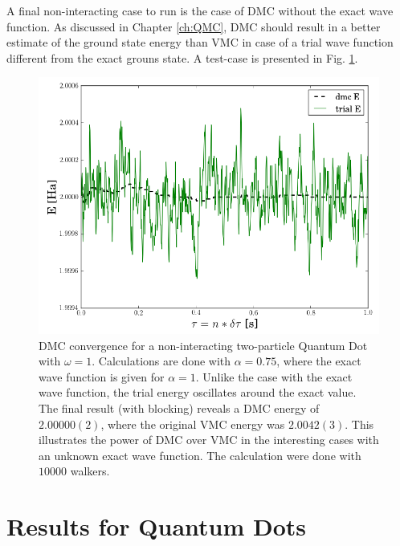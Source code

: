 A final non-interacting case to run is the case of DMC without the exact wave function. As discussed in Chapter \ref{ch:QMC}, DMC should result in a better estimate of the ground state energy than VMC in case of a trial wave function different from the exact grouns state. A test-case is presented in Fig. \ref{fig:DMC_nonExactWF}.

\begin{figure}
 \begin{center}
  \includegraphics[scale=0.5]{../Graphics/DMC_notExactWF.png}
  \caption{DMC convergence for a non-interacting two-particle Quantum Dot with $\omega=1$. Calculations are done with $\alpha=0.75$, where the exact wave function is given for $\alpha=1$. Unlike the case with the exact wave function, the trial energy oscillates around the exact value. The final result (with blocking) reveals a DMC energy of $2.00000(2)$, where the original VMC energy was $2.0042(3)$. This illustrates the power of DMC over VMC in the interesting cases with an unknown exact wave function. The calculation were done with $10000$ walkers.}
  \label{fig:DMC_nonExactWF}
 \end{center}
\end{figure}

\clearpage

\section{Results for Quantum Dots}


